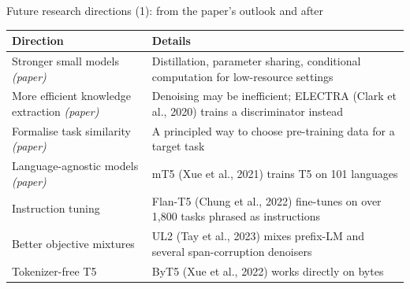 \documentclass[aspectratio=169,11pt]{beamer}
\begin{document}
\begin{frame}{Future research directions (1): from the paper's outlook and after}
  \small
  \begin{tabularx}{\textwidth}{@{}lX@{}}
    \toprule
    Direction & Details\\
    \midrule
    Stronger small models \emph{(paper)} & Distillation, parameter sharing, conditional computation for low-resource settings\\
    More efficient knowledge extraction \emph{(paper)} & Denoising may be inefficient; ELECTRA (Clark et al., 2020) trains a discriminator instead\\
    Formalise task similarity \emph{(paper)} & A principled way to choose pre-training data for a target task\\
    Language-agnostic models \emph{(paper)} & mT5 (Xue et al., 2021) trains T5 on 101 languages\\
    Instruction tuning & Flan-T5 (Chung et al., 2022) fine-tunes on over 1,800 tasks phrased as instructions\\
    Better objective mixtures & UL2 (Tay et al., 2023) mixes prefix-LM and several span-corruption denoisers\\
    Tokenizer-free T5 & ByT5 (Xue et al., 2022) works directly on bytes\\
    \bottomrule
  \end{tabularx}
\end{frame}
\end{document}
